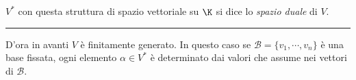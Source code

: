 $ V^{*} $ con questa struttura di spazio vettoriale su $ \K $ si dice lo \textit{spazio duale} di $ V $.

\rule{7em}{.4pt}

D'ora in avanti $ V $ è finitamente generato. In questo caso se $ \mathscr{B} =\{v_1, \cdots, v_{n}\} $ è una base fissata, ogni elemento $ \alpha \in V^{*} $ è determinato dai valori che assume nei vettori di $ \mathscr{B} $.

